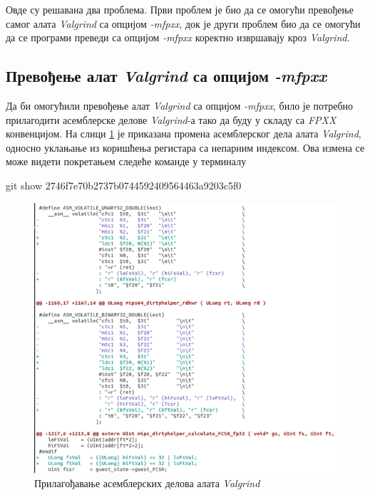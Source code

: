 \documentclass[12pt,oneside]{memoir}
\begin{document}
\indent Овде су решавана два проблема. Први проблем је био да се омогући превођење самог алата \textit{Valgrind} са опцијом \textit{-mfpxx}, док је други проблем био да се омогући да се програми преведи са опцијом \textit{-mfpxx} коректно извршавају кроз \textit{Valgrind}.

\subsection{Превођење алат \textit{Valgrind} са опцијом \textit{-mfpxx}}

\indent Да би омогућили превођење алат \textit{Valgrind} са опцијом \textit{-mfpxx}, било је потребно прилагодити асемблерске делове \textit{Valgrind}-а тако да буду у складу са \textit{FPXX} конвенцијом. На слици \ref{fig:asm} је приказана промена асемблерског дела алата 
\textit{Valgrind}, односно уклањање из коришћења регистара са непарним индексом. Ова измена се може видети покретањем следеће команде у терминалу

\begin{center}
git show 2746f7e70b2737b0744592409564463a9203c5f0
\end{center}

\begin{figure}[h!]
\begin{center}
\includegraphics[scale=0.75]{slika26.png}
\end{center}
\caption{Прилагођавање асемблерских делова алата \textit{Valgrind}}
\label{fig:asm}
\end{figure}
\end{document}
